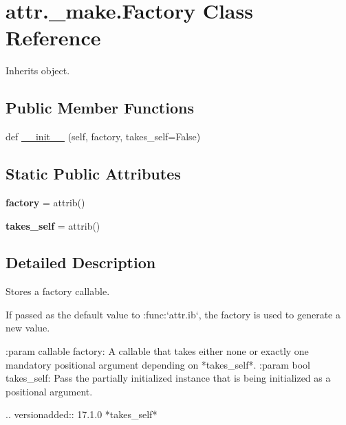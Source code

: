 \hypertarget{classattr_1_1__make_1_1_factory}{}\section{attr.\+\_\+make.\+Factory Class Reference}
\label{classattr_1_1__make_1_1_factory}


Inherits object.

\subsection*{Public Member Functions}
\begin{DoxyCompactItemize}
\item 
def \hyperlink{classattr_1_1__make_1_1_factory_a58b9a79c6890af8b87ac19dbdf00703c}{\+\_\+\+\_\+init\+\_\+\+\_\+} (self, factory, takes\+\_\+self=False)
\end{DoxyCompactItemize}
\subsection*{Static Public Attributes}
\begin{DoxyCompactItemize}
\item 
\mbox{\label{classattr_1_1__make_1_1_factory_a73c7c99477a3359f80c366335fded33e}} 
{\bfseries factory} = attrib()
\item 
\mbox{\label{classattr_1_1__make_1_1_factory_a9b55379dafa58be014f690608a114251}} 
{\bfseries takes\+\_\+self} = attrib()
\end{DoxyCompactItemize}


\subsection{Detailed Description}
\begin{DoxyVerb}Stores a factory callable.

If passed as the default value to :func:`attr.ib`, the factory is used to
generate a new value.

:param callable factory: A callable that takes either none or exactly one
    mandatory positional argument depending on *takes_self*.
:param bool takes_self: Pass the partially initialized instance that is
    being initialized as a positional argument.

.. versionadded:: 17.1.0  *takes_self*
\end{DoxyVerb}
 

